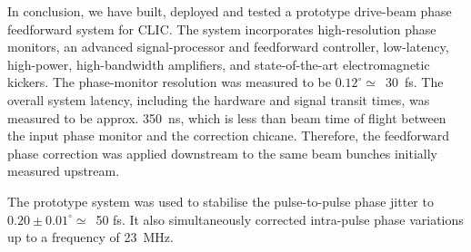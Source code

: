 \documentclass[%
 reprint,
 superscriptaddress,
 amsmath,
 amssymb,
 prl,
]{revtex4-1}
\begin{document}

In conclusion, we have built, deployed and tested a prototype drive-beam phase 
feedforward system for CLIC.   The system incorporates high-resolution phase 
monitors, an advanced signal-processor and feedforward controller, low-latency, 
high-power, high-bandwidth amplifiers, and state-of-the-art electromagnetic 
kickers. The phase-monitor resolution was measured to be 
\(0.12^\circ\simeq\)~30~fs.  The overall system latency, including the hardware 
and 
signal transit times, was measured to be approx. 350~ns, which is less than 
beam time of flight between the input phase monitor and the correction 
chicane.  Therefore, the feedforward phase correction was applied downstream to 
the same beam bunches initially measured upstream.

The prototype system was used to stabilise the pulse-to-pulse  
phase jitter to \(0.20\pm0.01^\circ\simeq\)~50 fs. It also simultaneously 
corrected intra-pulse phase variations up to a frequency of 23~MHz. 



\end{document}
